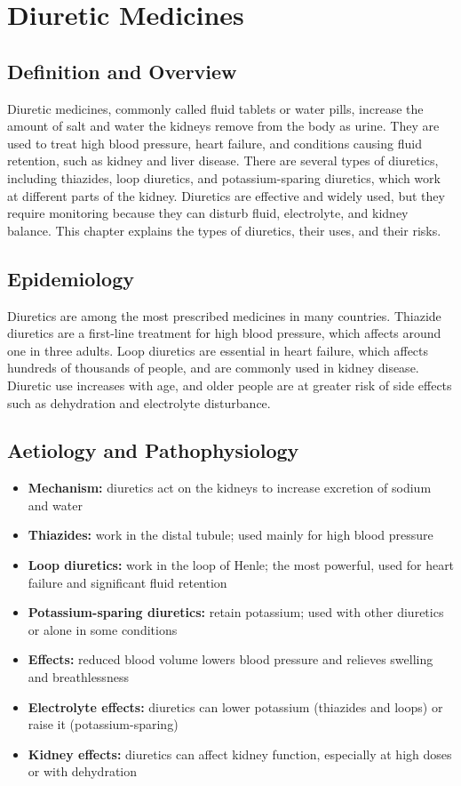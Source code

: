 \chapter{Diuretic Medicines}

\section*{Definition and Overview}
Diuretic medicines, commonly called fluid tablets or water pills, increase the amount of salt and water the kidneys remove from the body as urine. They are used to treat high blood pressure, heart failure, and conditions causing fluid retention, such as kidney and liver disease. There are several types of diuretics, including thiazides, loop diuretics, and potassium-sparing diuretics, which work at different parts of the kidney. Diuretics are effective and widely used, but they require monitoring because they can disturb fluid, electrolyte, and kidney balance. This chapter explains the types of diuretics, their uses, and their risks.

\section*{Epidemiology}
Diuretics are among the most prescribed medicines in many countries. Thiazide diuretics are a first-line treatment for high blood pressure, which affects around one in three adults. Loop diuretics are essential in heart failure, which affects hundreds of thousands of people, and are commonly used in kidney disease. Diuretic use increases with age, and older people are at greater risk of side effects such as dehydration and electrolyte disturbance.

\section*{Aetiology and Pathophysiology}
\begin{itemize}
    \item \textbf{Mechanism:} diuretics act on the kidneys to increase excretion of sodium and water
    \item \textbf{Thiazides:} work in the distal tubule; used mainly for high blood pressure
    \item \textbf{Loop diuretics:} work in the loop of Henle; the most powerful, used for heart failure and significant fluid retention
    \item \textbf{Potassium-sparing diuretics:} retain potassium; used with other diuretics or alone in some conditions
    \item \textbf{Effects:} reduced blood volume lowers blood pressure and relieves swelling and breathlessness
    \item \textbf{Electrolyte effects:} diuretics can lower potassium (thiazides and loops) or raise it (potassium-sparing)
    \item \textbf{Kidney effects:} diuretics can affect kidney function, especially at high doses or with dehydration
\end{itemize}

